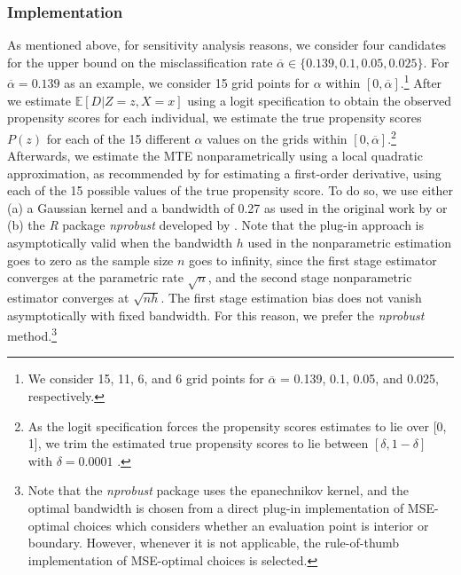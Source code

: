 \documentclass[11pt,reqno]{amsart}
\theoremstyle{plain}
\numberwithin{equation}{section}
\begin{document}
\subsubsection*{Implementation}
As mentioned above, for sensitivity analysis reasons, we consider four candidates for the upper bound on the misclassification rate $\overline{\alpha} \in \{0.139, 0.1, 0.05, 0.025\}$.
For $\overline{\alpha}=0.139$ as an example, we consider 15 grid points for $\alpha$ within $[0, \overline{\alpha}]$.\footnote{We consider 15, 11, 6, and 6 grid points for $\overline{\alpha}$ = 0.139, 0.1, 0.05, and 0.025, respectively.}
After we estimate $\mathbb{E}[D|Z=z, X=x]$ using a logit specification to obtain the observed propensity scores for each individual, we estimate the true propensity scores $P(z)$ for each of the 15 different $\alpha$ values on the grids within $[0, \overline{\alpha}]$.\footnote{As the logit specification forces the propensity scores estimates to lie over [0, 1], we trim the estimated true propensity scores to lie between $[\delta, 1-\delta]$ with $\delta = 0.0001$ \citep{carneirolee2009}.}
Afterwards, we estimate the MTE nonparametrically using a local quadratic approximation, as recommended by \cite{fan1996local} for estimating a first-order derivative, using each of the 15 possible values of the true propensity score.
To do so, we use either (a) a Gaussian kernel and a bandwidth of 0.27 as used in the original work by \cite{Carneiroal2017} or (b) the \textit{R} package \textit{nprobust} developed by \cite{2019arXiv190600198C}. Note that the plug-in approach is asymptotically valid when the bandwidth $h$ used in the nonparametric estimation goes to zero as the sample size $n$ goes to infinity, since the first stage estimator converges at the parametric rate $\sqrt{n}$, and the second stage nonparametric estimator converges at $\sqrt{n h}$. The first stage estimation bias does not vanish asymptotically with fixed bandwidth. For this reason, we prefer the \textit{nprobust} method.\footnote{Note that the \textit{nprobust} package uses the epanechnikov kernel, and the optimal bandwidth is chosen from a direct plug-in implementation of MSE-optimal choices which considers whether an evaluation point is interior or boundary. However, whenever it is not applicable, the rule-of-thumb implementation of MSE-optimal choices is selected.}
\end{document}

